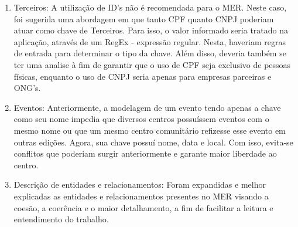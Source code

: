\begin{enumerate}
    \item Terceiros: A utilização de ID's não é recomendada para o MER. Neste caso, foi sugerida uma abordagem em que tanto CPF quanto CNPJ poderiam atuar como chave de Terceiros. Para isso, o valor informado seria tratado na aplicação, através de um RegEx - expressão regular. Nesta, haveriam regras de entrada para determinar o tipo da chave. Além disso, deveria também se ter uma analise à fim de garantir que o uso de CPF seja exclusivo de pessoas físicas, enquanto o uso de CNPJ seria apenas para empresas parceiras e ONG's.
    \item Eventos: Anteriormente, a modelagem de um evento tendo apenas a chave como seu nome impedia que diversos centros possuíssem eventos com o mesmo nome ou que um mesmo centro comunitário refizesse esse evento em outras edições. Agora, sua chave possuí nome, data e local. Com isso, evita-se conflitos que poderiam surgir anteriormente e garante maior liberdade ao centro.

    \item Descrição de entidades e relacionamentos: Foram expandidas e melhor explicadas as entidades e relacionamentos presentes no MER visando a coesão, a coerência e o maior detalhamento, a fim de facilitar a leitura e entendimento do trabalho.
\end{enumerate}